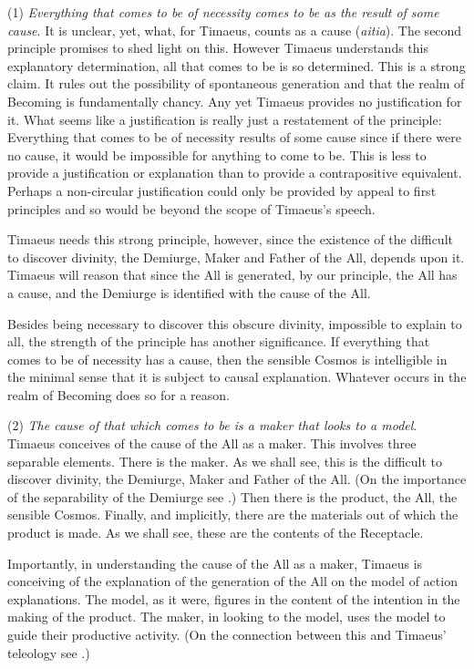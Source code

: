 (1) \emph{Everything that comes to be of necessity comes to be as the result of some cause}. It is unclear, yet, what, for Timaeus, counts as a cause (\emph{aitia}). The second principle promises to shed light on this. However Timaeus understands this explanatory determination, all that comes to be is so determined. This is a strong claim. It rules out the possibility of spontaneous generation and that the realm of Becoming is fundamentally chancy. Any yet Timaeus provides no justification for it. What seems like a justification is really just a restatement of the principle: Everything that comes to be of necessity results of some cause since if there were no cause, it would be impossible for anything to come to be. This is less to provide a justification or explanation than to provide a contrapositive equivalent. Perhaps a non-circular justification could only be provided by appeal to first principles and so would be beyond the scope of Timaeus's speech.

Timaeus needs this strong principle, however, since the existence of the difficult to discover divinity, the Demiurge, Maker and Father of the All, depends upon it. Timaeus will reason that since the All is generated, by our principle, the All has a cause, and the Demiurge is identified with the cause of the All. 

Besides being necessary to discover this obscure divinity, impossible to explain to all, the strength of the principle has another significance. If everything that comes to be of necessity has a cause, then the sensible Cosmos is intelligible in the minimal sense that it is subject to causal explanation. Whatever occurs in the realm of Becoming does so for a reason.

(2) \emph{The cause of that which comes to be is a maker that looks to a model}. Timaeus conceives of the cause of the All as a maker. This involves three separable elements. There is the maker. As we shall see, this is the difficult to discover divinity, the Demiurge, Maker and Father of the All. (On the importance of the separability of the Demiurge see \citealt[chapter 1]{Broadie:2012vl}.) Then there is the product, the All, the sensible Cosmos. Finally, and implicitly, there are the materials out of which the product is made. As we shall see, these are the contents of the Receptacle. 

Importantly, in understanding the cause of the All as a maker, Timaeus is conceiving of the explanation of the generation of the All on the model of action explanations. The model, as it were, figures in the content of the intention in the making of the product. The maker, in looking to the model, uses the model to guide their productive activity. (On the connection between this and Timaeus' teleology see \citealt{Johansen:2004dx}.)

